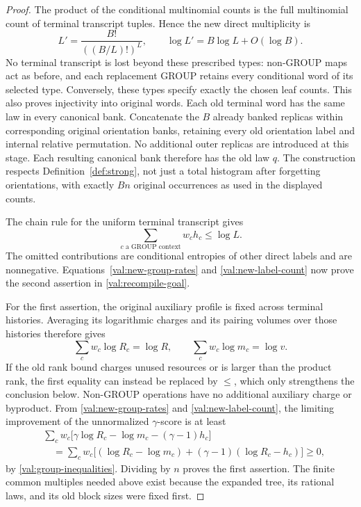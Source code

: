 \documentclass[11pt]{article}
\numberwithin{equation}{section}
\theoremstyle{definition}
\theoremstyle{remark}
\begin{document}
\begin{proof}
The product of the conditional multinomial counts is the full multinomial
count of terminal transcript tuples.  Hence the new direct multiplicity is
\begin{equation}
 L'=\frac{B!}{((B/L)!)^L},\qquad
 \log L'=B\log L+O(\log B).
\label{val:new-label-count}
\end{equation}
No terminal transcript is lost beyond these prescribed types: non-GROUP
maps act as before, and each replacement GROUP retains every conditional
word of its selected type.  Conversely, these types specify exactly the
chosen leaf counts.  This also proves injectivity into original words.
Each old terminal word has the same law in every canonical bank.
Concatenate the $B$ already banked replicas within corresponding original
orientation banks, retaining every old orientation label and internal
relative permutation.  No additional outer replicas are introduced at this
stage.  Each resulting canonical bank therefore has the old law $q$.
The construction respects Definition~\ref{def:strong}, not just a total
histogram after forgetting orientations, with exactly $Bn$ original
occurrences as used in the displayed counts.

The chain rule for the uniform terminal transcript gives
\begin{equation}
 \sum_{c\text{ a GROUP context}}w_ch_c\le\log L.
\label{val:group-chain-rule}
\end{equation}
The omitted contributions are conditional entropies of other direct labels
and are nonnegative.  Equations~\eqref{val:new-group-rates} and
\eqref{val:new-label-count} now prove the second assertion in
\eqref{val:recompile-goal}.

For the first assertion, the original auxiliary profile is fixed across
terminal histories.  Averaging its logarithmic charges and its pairing
volumes over those histories therefore gives
\[
 \sum_c w_c\log R_c=\log R,\qquad
 \sum_c w_c\log m_c=\log v.
\]
If the old rank bound charges unused resources or is larger than the product
rank, the first equality can instead be replaced by $\le$, which only
strengthens the conclusion below.  Non-GROUP operations have no additional
auxiliary charge or byproduct.  From \eqref{val:new-group-rates} and
\eqref{val:new-label-count}, the limiting improvement of the unnormalized
$\gamma$-score is at least
\begin{align*}
 &\sum_c w_c\bigl[
       \gamma\log R_c-\log m_c-(\gamma-1)h_c\bigr]\\
 &\quad=\sum_c w_c\bigl[
       (\log R_c-\log m_c)
       +(\gamma-1)(\log R_c-h_c)\bigr]\ge0,
\end{align*}
by \eqref{val:group-inequalities}.  Dividing by $n$ proves the first
assertion.  The finite common multiples needed above exist because the
expanded tree, its rational laws, and its old block sizes were fixed first.
\end{proof}
\end{document}
